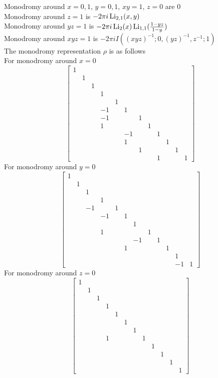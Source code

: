 \documentclass[main]{subfiles}
\begin{document}
Monodromy around $x=0,1$, $y=0,1$, $xy=1$, $z=0$ are $0$ \\
Monodromy around $z=1$ is $-2\pi i\operatorname{Li}_{2,1}(x,y)$ \\
Monodromy around $yz=1$ is $-2\pi i\operatorname{Li}_2(x)\operatorname{Li}_{1,1}(\frac{1-yz}{1-y})$ \\
Monodromy around $xyz=1$ is $-2\pi iI((xyz)^{-1};0,(yz)^{-1},z^{-1};1)$ \\
The monodromy representation $\rho$ is as follows \\
For monodromy around $x=0$
\[\begin{bmatrix}
1\\
&1\\
&&1\\
&&&1\\
&&&&1\\
&&&-1&&1\\
&&&-1&&&1\\
&&&1&&&&1\\
&&&&&-1&&&1\\
&&&&&1&&&&1\\
&&&&&&1&&&&1\\
&&&&&&&&1&&&1
\end{bmatrix}\]
For monodromy around $y=0$
\[\begin{bmatrix}
1\\
&1\\
&&1\\
&&&1\\
&&-1&&1\\
&&&-1&&1\\
&&&&&&1\\
&&&1&&&&1\\
&&&&&&-1&&1\\
&&&&&1&&&&1\\
&&&&&&&&&&1\\
&&&&&&&&&&-1&1
\end{bmatrix}\]
For monodromy around $z=0$
\[\begin{bmatrix}
1\\
&1\\
&&1\\
&&&1\\
&&&&1\\
&&&&&1\\
&&&&&&1\\
&&&1&&&&1\\
&&&&&&&&1\\
&&&&&&&&&1\\
&&&&&&&&&&1\\
&&&&&&&&&&&1
\end{bmatrix}\]
\end{document}
